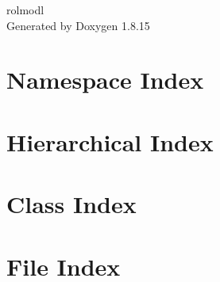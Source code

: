 \let\mypdfximage\pdfximage\def\pdfximage{\immediate\mypdfximage}\documentclass[twoside]{book}
\newcommand{\+}{\discretionary{\mbox{\scriptsize$\hookleftarrow$}}{}{}}
\newcommand{\clearemptydoublepage}{%
  \newpage{\pagestyle{empty}\cleardoublepage}%
}
\begin{document}
\hypersetup{pageanchor=false,
             bookmarksnumbered=true,
             pdfencoding=unicode
            }
\begin{titlepage}
\vspace*{7cm}
\begin{center}%
{\Large rolmodl }\\
\vspace*{1cm}
{\large Generated by Doxygen 1.8.15}\\
\end{center}
\end{titlepage}
\clearemptydoublepage
{}
\tableofcontents
\clearemptydoublepage
{}
\hypersetup{pageanchor=true}

\chapter{Namespace Index}

\chapter{Hierarchical Index}

\chapter{Class Index}

\chapter{File Index}

\end{document}
